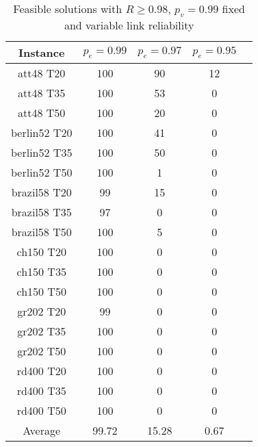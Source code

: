 \documentclass{llncs}
\begin{document}
\begin{table}
\caption{Feasible solutions with $R \geq 0.98$,  
$p_v=0.99$ fixed and variable link reliability} %
\centering  %
\begin{tabular}{|c|c|c|c|c|} %
\hline	Instance  &	$p_e=0.99$ & 	$p_e=0.97$ & 	$p_e=0.95$\\
\hline	att48 T20	&	100	&	90	&	12	\\
\hline	att48 T35	&	100	&	53	&	0	\\
\hline	att48 T50	&	100	&	20	&	0	\\
\hline	berlin52 T20	&	100	&	41	&	0	\\
\hline	berlin52 T35	&	100	&	50	&	0	\\
\hline	berlin52 T50	&	100	&	1	&	0	\\
\hline	brazil58 T20	&	99	&	15	&	0	\\
\hline	brazil58 T35	&	97	&	0	&	0	\\
\hline	brazil58 T50	&	100	&	5	&	0	\\
\hline	ch150 T20	&	100	&	0	&	0	\\
\hline	ch150 T35	&	100	&	0	&	0	\\
\hline	ch150 T50	&	100	&	0	&	0	\\
\hline	gr202 T20	&	99	&	0	&	0	\\
\hline	gr202 T35	&	100	&	0	&	0	\\
\hline	gr202 T50	&	100	&	0	&	0	\\
\hline	rd400 T20	&	100	&	0	&	0	\\
\hline	rd400 T35	&	100	&	0	&	0	\\
\hline	rd400 T50	&	100	&	0	&	0	\\
\hline  Average     & 99.72    &   15.28   &  0.67 \\
\hline
\end{tabular}
\label{answer2a} %
\end{table}
\end{document}
